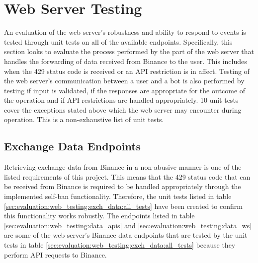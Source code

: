 \section{Web Server Testing}
\label{sec:evaluation:web_server}

\noindent An evaluation of the web server's robustness and ability to respond to events is tested through unit tests on all of the available endpoints. Specifically, this section looks to evaluate the process performed by the part of the web server that handles the forwarding of data received from Binance to the user. This includes when the 429 status code is received or an API restriction is in affect. Testing of the web server's communication between a user and a bot is also performed by testing if input is validated, if the responses are appropriate for the outcome of the operation and if API restrictions are handled appropriately. 10 unit tests cover the exceptions stated above which the web server may encounter during operation. This is a non-exhaustive list of unit tests.


\subsection{Exchange Data Endpoints}
\label{sec:evaluation:web_server:exch_data}

\noindent Retrieving exchange data from Binance in a non-abusive manner is one of the listed requirements of this project. This means that the 429 status code that can be received from Binance is required to be handled appropriately through the implemented self-ban functionality. Therefore, the unit tests listed in table \ref{sec:evaluation:web_testing:exch_data:all_tests} have been created to confirm this functionality works robustly. The endpoints listed in table \ref{sec:evaluation:web_testing:data_apis} and \ref{sec:evaluation:web_testing:data_ws} are some of the web server's Binance data endpoints that are tested by the unit tests in table \ref{sec:evaluation:web_testing:exch_data:all_tests} because they perform API requests to Binance. 

